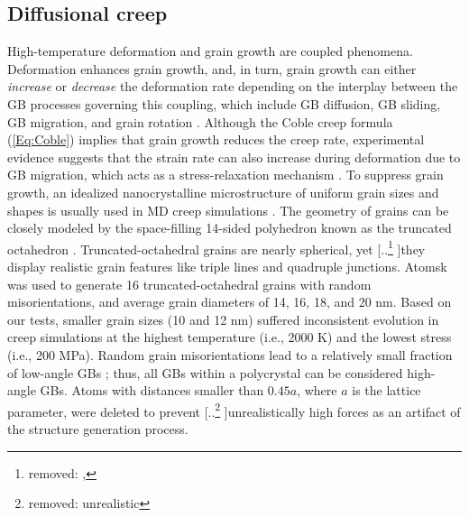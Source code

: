 \documentclass[preprint,12pt,sort&compress]{elsarticle} %
\newcommand{\?}{\stackrel{?}{=}}
\providecommand{\DIFaddtex}[1]{{\sf #1}} %
\providecommand{\DIFdeltex}[1]{{[..\footnote{removed: #1} ]}} %
\providecommand{\DIFaddbegin}{\protect\color{blue}} %
\providecommand{\DIFaddend}{\protect\color{black}} %
\providecommand{\DIFdelbegin}{\protect\color{red}} %
\providecommand{\DIFdelend}{\protect\color{black}} %
\providecommand{\DIFadd}[1]{\texorpdfstring{\DIFaddtex{#1}}{#1}} %
\providecommand{\DIFdel}[1]{\texorpdfstring{\DIFdeltex{#1}}{}} %
\newcommand{\DIFscaledelfig}{0.5}
\newlength{\DIFdelgraphicswidth} %
\newlength{\DIFdelgraphicsheight} %
\newcommand{\DIFaddincludegraphics}[2][]{{\color{blue}\fbox{\DIFOincludegraphics[#1]{#2}}}} %
\newcommand{\DIFdelincludegraphics}[2][]{%
\sbox{\DIFdelgraphicsbox}{\DIFOincludegraphics[#1]{#2}}%
\settoboxwidth{\DIFdelgraphicswidth}{\DIFdelgraphicsbox} %
\settoboxtotalheight{\DIFdelgraphicsheight}{\DIFdelgraphicsbox} %
\scalebox{\DIFscaledelfig}{%
\parbox[b]{\DIFdelgraphicswidth}{\usebox{\DIFdelgraphicsbox}\\[-\baselineskip] \rule{\DIFdelgraphicswidth}{0em}}\llap{\resizebox{\DIFdelgraphicswidth}{\DIFdelgraphicsheight}{%
\setlength{\unitlength}{\DIFdelgraphicswidth}%
\begin{picture}(1,1)%
\thicklines\linethickness{2pt} %
{\color[rgb]{1,0,0}\put(0,0){\framebox(1,1){}}}%
{\color[rgb]{1,0,0}\put(0,0){\line( 1,1){1}}}%
{\color[rgb]{1,0,0}\put(0,1){\line(1,-1){1}}}%
\end{picture}%
}\hspace*{3pt}}} %
} %
\DeclareRobustCommand{\DIFaddbegin}{\DIFOaddbegin \let\includegraphics\DIFaddincludegraphics} %
\DeclareRobustCommand{\DIFaddend}{\DIFOaddend \let\includegraphics\DIFOincludegraphics} %
\DeclareRobustCommand{\DIFdelbegin}{\DIFOdelbegin \let\includegraphics\DIFdelincludegraphics} %
\DeclareRobustCommand{\DIFdelend}{\DIFOaddend \let\includegraphics\DIFOincludegraphics} %
\begin{document}
\subsection{Diffusional creep}

High-temperature deformation and grain growth are coupled phenomena. Deformation enhances grain growth, and, in turn, grain growth can either \textit{increase} or \textit{decrease} the deformation rate depending on the interplay between the GB processes governing this coupling\DIFaddbegin \DIFadd{, }\DIFaddend which include GB diffusion, GB sliding, GB migration, and grain rotation \cite{Haslam2004}. Although the Coble creep formula (\cref{Eq:Coble}) implies that grain growth reduces the creep rate, experimental evidence suggests that the strain rate can also increase during deformation due to GB migration\DIFaddbegin \DIFadd{, }\DIFaddend which acts as a stress-relaxation mechanism \cite{Haslam2004}. To suppress grain growth, an idealized nanocrystalline microstructure of uniform grain sizes and shapes is usually used in MD creep simulations \cite{Keblinski1998, Yamakov2002}. The geometry of grains can be closely modeled by the space-filling 14-sided polyhedron known as the truncated octahedron \cite{Yamakov2002, Olander2017}. Truncated-octahedral grains are nearly spherical, yet \DIFdelbegin \DIFdel{, }\DIFdelend they display realistic grain features like triple lines and quadruple junctions. Atomsk \cite{Hirel2015} was used to generate 16 truncated-octahedral grains with random misorientations, and average grain diameters of 14, 16, 18, and 20 nm. Based on our tests, smaller grain sizes (10 and 12 nm) suffered inconsistent evolution in creep simulations at the highest temperature (i.e., 2000 K) and the lowest stress (i.e., 200 MPa). Random grain misorientations lead to a relatively small fraction of low-angle GBs \cite{Yamakov2002, Haslam2004}; thus, all GBs within a polycrystal can be considered high-angle GBs. Atoms with distances smaller than $0.45a$, where $a$ is the lattice parameter, were deleted to prevent \DIFdelbegin \DIFdel{unrealistic }\DIFdelend \DIFaddbegin \DIFadd{unrealistically }\DIFaddend high forces as an artifact of the structure generation process.
\end{document}

